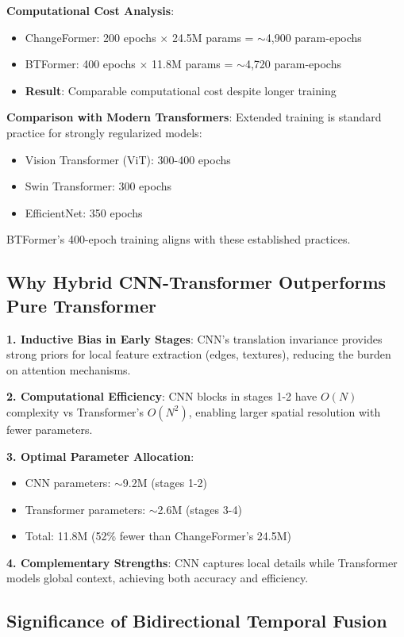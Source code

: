 \documentclass[journal]{IEEEtran}
\begin{document}
\textbf{Computational Cost Analysis}:
\begin{itemize}
    \item ChangeFormer: 200 epochs $\times$ 24.5M params = $\sim$4,900 param-epochs
    \item BTFormer: 400 epochs $\times$ 11.8M params = $\sim$4,720 param-epochs
    \item \textbf{Result}: Comparable computational cost despite longer training
\end{itemize}

\textbf{Comparison with Modern Transformers}: Extended training is standard practice for strongly regularized models:
\begin{itemize}
    \item Vision Transformer (ViT): 300-400 epochs
    \item Swin Transformer: 300 epochs
    \item EfficientNet: 350 epochs
\end{itemize}

BTFormer's 400-epoch training aligns with these established practices.

\subsection{Why Hybrid CNN-Transformer Outperforms Pure Transformer}

\textbf{1. Inductive Bias in Early Stages}: CNN's translation invariance provides strong priors for local feature extraction (edges, textures), reducing the burden on attention mechanisms.

\textbf{2. Computational Efficiency}: CNN blocks in stages 1-2 have $O(N)$ complexity vs Transformer's $O(N^2)$, enabling larger spatial resolution with fewer parameters.

\textbf{3. Optimal Parameter Allocation}:
\begin{itemize}
    \item CNN parameters: $\sim$9.2M (stages 1-2)
    \item Transformer parameters: $\sim$2.6M (stages 3-4)
    \item Total: 11.8M (52\% fewer than ChangeFormer's 24.5M)
\end{itemize}

\textbf{4. Complementary Strengths}: CNN captures local details while Transformer models global context, achieving both accuracy and efficiency.

\subsection{Significance of Bidirectional Temporal Fusion}
\end{document}
